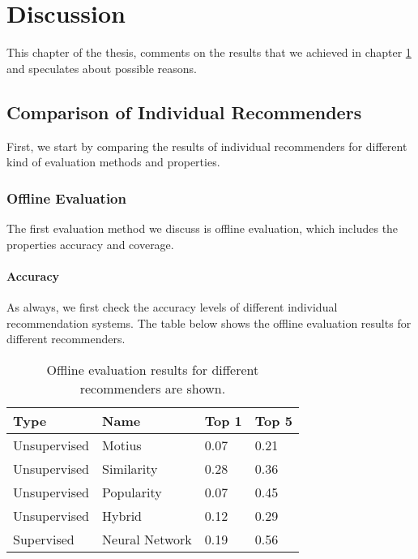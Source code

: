 
\chapter{Discussion}\label{chapter:discussion}

This chapter of the thesis, comments on the results that we achieved in chapter \ref{chapter:discussion} and speculates about possible reasons.

\section{Comparison of Individual Recommenders}

First, we start by comparing the results of individual recommenders for different kind of evaluation methods and properties.

\subsection{Offline Evaluation}

The first evaluation method we discuss is offline evaluation, which includes the properties accuracy and coverage.

\subsubsection{Accuracy}\label{discussion:single-offline-accuracy}

As always, we first check the accuracy levels of different individual recommendation systems. The table below shows the offline evaluation results for different recommenders.

\begin{table}[htp]
	\caption{Offline evaluation results for different recommenders are shown.}
	\centering
	\begin{tabular}{|l|l|l|l|}
		\hline
		Type         & Name           & Top 1 & Top 5 \\ \hline
		Unsupervised & Motius         & 0.07  & 0.21  \\ \hline
		Unsupervised & Similarity     & 0.28  & 0.36  \\ \hline
		Unsupervised & Popularity     & 0.07  & 0.45  \\ \hline
		Unsupervised & Hybrid         & 0.12  & 0.29  \\ \hline
		Supervised   & Neural Network & 0.19  & 0.56  \\ \hline
	\end{tabular}
	\label{discussion:accuracy-offline}
\end{table}


